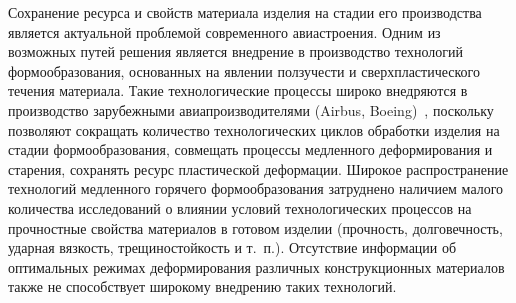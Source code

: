 



\date{}








\renewcommand{\JournalDataOnline}{\displaydate{iyave}}




\makerutitle






Сохранение ресурса и свойств материала изделия на стадии его производства является актуальной проблемой современного авиастроения. Одним из возможных путей решения является внедрение в производство технологий формообразования, основанных на явлении ползучести и сверхпластического течения материала. Такие технологические процессы широко внедряются в производство зарубежными авиапроизводителями (Airbus, Boeing)~\cite{iya:Ribeiro,iya:Beal}, поскольку позволяют сокращать количество технологических циклов обработки изделия на стадии формообразования, совмещать процессы медленного деформирования и старения, сохранять ресурс пластической деформации. Широкое распространение технологий медленного горячего формообразования затруднено наличием малого количества исследований о влиянии условий технологических процессов на прочностные свойства материалов в готовом изделии (прочность, долговечность, ударная вязкость, трещиностойкость и т.~п.). Отсутствие информации об оптимальных режимах деформирования различных конструкционных материалов также не способствует широкому внедрению таких технологий.

